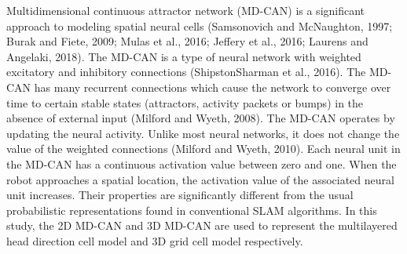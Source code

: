 Multidimensional continuous attractor network (MD-CAN) is a significant approach to modeling spatial neural cells (Samsonovich and McNaughton, 1997; Burak and Fiete, 2009; Mulas et al., 2016; Jeffery et al., 2016; Laurens and Angelaki, 2018). 
The MD-CAN is a type of neural network with weighted excitatory and inhibitory connections (ShipstonSharman et al., 2016). 
The MD-CAN has many recurrent connections which cause the network to converge over time to certain stable states (attractors, activity packets or bumps) in the absence of external input (Milford and Wyeth, 2008). 
The MD-CAN operates by updating the neural activity. Unlike most neural networks, it does not change the value of the weighted connections (Milford and Wyeth, 2010). 
Each neural unit in the MD-CAN has a continuous activation value between zero and one. 
When the robot approaches a spatial location, the activation value of the associated neural unit increases. 
Their properties are significantly different from the usual probabilistic representations found in conventional SLAM algorithms. 
In this study, the 2D MD-CAN and 3D MD-CAN are used to represent the multilayered head direction cell model and 3D grid cell model respectively.


